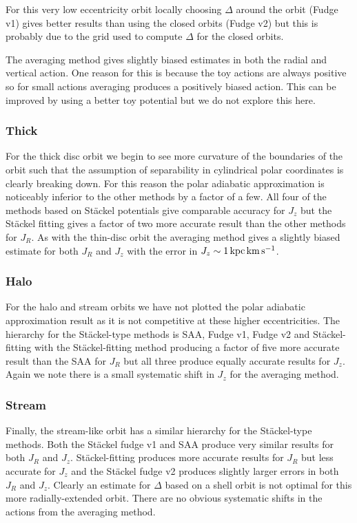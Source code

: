 \documentclass[useAMS,usenatbib,fleqn,a4paper]{mn2e}
\def\kpc{\,{\rm kpc}}
\def\kms{\,{\rm km\,s^{-1}}}
\begin{document}
For this very low eccentricity orbit locally choosing $\Delta$ around the orbit (Fudge v1) gives better results than using the closed orbits (Fudge v2) but this is probably due to the grid used to compute $\Delta$ for the closed orbits.

The averaging method gives slightly biased estimates in both the radial and vertical action. One reason for this is because the toy actions are always positive so for small actions averaging produces a positively biased action. This can be improved by using a better toy potential but we do not explore this here.

\subsubsection{Thick}
For the thick disc orbit we begin to see more curvature of the boundaries of the orbit such that the assumption of separability in cylindrical polar coordinates is clearly breaking down. For this reason the polar adiabatic approximation is noticeably inferior to the other methods by a factor of a few. All four of the methods based on St\"ackel potentials give comparable accuracy for $J_z$ but the St\"ackel fitting gives a factor of two more accurate result than the other methods for $J_R$. As with the thin-disc orbit the averaging method gives a slightly biased estimate for both $J_R$ and $J_z$ with the error in $J_z\sim 1\kpc\kms$.
\subsubsection{Halo}
For the halo and stream orbits we have not plotted the polar adiabatic approximation result as it is not competitive at these higher eccentricities. The hierarchy for the St\"ackel-type methods is SAA, Fudge v1, Fudge v2 and St\"ackel-fitting with the St\"ackel-fitting method producing a factor of five more accurate result than the SAA for $J_R$ but all three produce equally accurate results for $J_z$. Again we note there is a small systematic shift in $J_z$ for the averaging method.
\subsubsection{Stream}
Finally, the stream-like orbit has a similar hierarchy for the St\"ackel-type methods. Both the St\"ackel fudge v1 and SAA produce very similar results for both $J_R$ and $J_z$. St\"ackel-fitting produces more accurate results for $J_R$ but less accurate for $J_z$ and the St\"ackel fudge v2 produces slightly larger errors in both $J_R$ and $J_z$. Clearly an estimate for $\Delta$ based on a shell orbit is not optimal for this more radially-extended orbit. There are no obvious systematic shifts in the actions from the averaging method.
\end{document}
